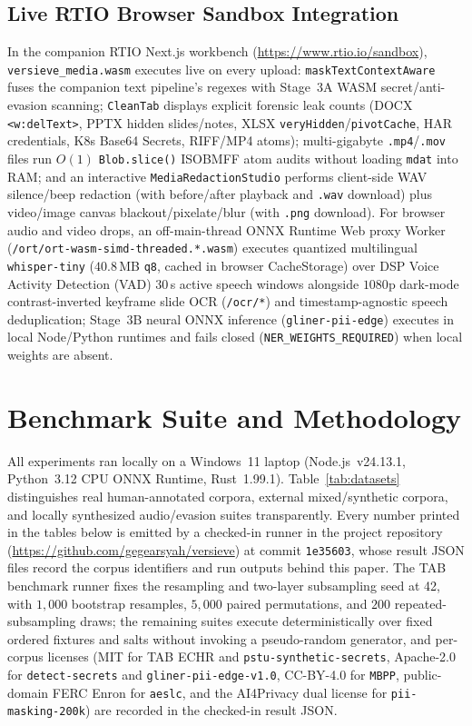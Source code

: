 \documentclass{article}
\begin{document}
\subsection{Live RTIO Browser Sandbox Integration}
In the companion RTIO Next.js workbench (\url{https://www.rtio.io/sandbox}), \texttt{versieve\_media.wasm} executes live on every upload: \texttt{maskTextContextAware} fuses the companion text pipeline's regexes \citep{ardiyansyah2026versieve} with Stage~3A WASM secret/anti-evasion scanning; \texttt{CleanTab} displays explicit forensic leak counts (DOCX \texttt{<w:delText>}, PPTX hidden slides/notes, XLSX \texttt{veryHidden}/\texttt{pivotCache}, HAR credentials, K8s Base64 Secrets, RIFF/MP4 atoms); multi-gigabyte \texttt{.mp4}/\texttt{.mov} files run $O(1)$ \texttt{Blob.slice()} ISOBMFF atom audits without loading \texttt{mdat} into RAM; and an interactive \texttt{MediaRedactionStudio} performs client-side WAV silence/beep redaction (with before/after playback and \texttt{.wav} download) plus video/image canvas blackout/pixelate/blur (with \texttt{.png} download). For browser audio and video drops, an off-main-thread ONNX Runtime Web proxy Worker (\texttt{/ort/ort-wasm-simd-threaded.*.wasm}) executes quantized multilingual \texttt{whisper-tiny} ($40.8$\,MB \texttt{q8}, cached in browser CacheStorage) over DSP Voice Activity Detection (VAD) $30$\,s active speech windows alongside $1080$p dark-mode contrast-inverted keyframe slide OCR (\texttt{/ocr/*}) and timestamp-agnostic speech deduplication; Stage~3B neural ONNX inference (\texttt{gliner-pii-edge}) executes in local Node/Python runtimes and fails closed (\texttt{NER\_WEIGHTS\_REQUIRED}) when local weights are absent.

\section{Benchmark Suite and Methodology}
\label{sec:datasets}

All experiments ran locally on a Windows~11 laptop (Node.js~v24.13.1, Python~3.12 CPU ONNX Runtime, Rust~1.99.1). Table~\ref{tab:datasets} distinguishes real human-annotated corpora, external mixed/synthetic corpora, and locally synthesized audio/evasion suites transparently. Every number printed in the tables below is emitted by a checked-in runner in the project repository (\url{https://github.com/gegearsyah/versieve}) at commit \texttt{1e35603}, whose result JSON files record the corpus identifiers and run outputs behind this paper. The TAB benchmark runner fixes the resampling and two-layer subsampling seed at 42, with $1{,}000$ bootstrap resamples, $5{,}000$ paired permutations, and $200$ repeated-subsampling draws; the remaining suites execute deterministically over fixed ordered fixtures and salts without invoking a pseudo-random generator, and per-corpus licenses (MIT for TAB ECHR and \texttt{pstu-synthetic-secrets}, Apache-2.0 for \texttt{detect-secrets} and \texttt{gliner-pii-edge-v1.0}, CC-BY-4.0 for \texttt{MBPP}, public-domain FERC Enron for \texttt{aeslc}, and the AI4Privacy dual license for \texttt{pii-masking-200k}) are recorded in the checked-in result JSON.
\end{document}
